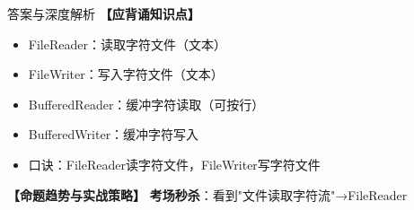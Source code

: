\documentclass[12pt, a4paper]{ctexart}
\begin{document}
\begin{enumerate}[label=\textbf{\arabic*.}]
\begin{bluebox}{答案与深度解析}
		      \textbf{【应背诵知识点】}
		      \begin{itemize}[label={}, nosep]
			      \item FileReader：读取字符文件（文本）
			      \item FileWriter：写入字符文件（文本）
			      \item BufferedReader：缓冲字符读取（可按行）
			      \item BufferedWriter：缓冲字符写入
			      \item 口诀：FileReader读字符文件，FileWriter写字符文件
		      \end{itemize}

		      \textbf{【命题趋势与实战策略】}
		      \textbf{考场秒杀}：看到"文件读取字符流"→FileReader
	      \end{bluebox}

\end{enumerate}
\end{document}
